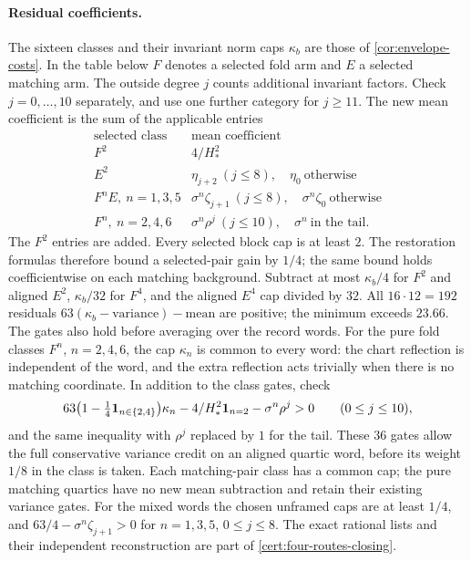 \paragraph{Residual coefficients.}
The sixteen classes and their invariant norm caps $\kappa_b$ are
those of \cref{cor:envelope-costs}. In the table below $F$ denotes a
selected fold arm and $E$ a selected matching arm. The outside degree
$j$ counts additional invariant factors. Check $j=0,\ldots,10$
separately, and use one further category for $j\ge11$.
The new mean coefficient is the sum of the applicable entries
\[
\begin{array}{c|c}
\text{selected class}&\text{mean coefficient}\\ \hline
F^2&4/H_*^2\\
E^2&\eta_{j+2}\ (j\le8),\quad\eta_0\ \text{otherwise}\\
F^nE,\ n=1,3,5&\sigma^n\zeta_{j+1}\ (j\le8),\quad\sigma^n\zeta_0\ \text{otherwise}\\
F^n,\ n=2,4,6&\sigma^n\rho^j\ (j\le10),\quad\sigma^n\ \text{in the tail}.
\end{array}
\]
The $F^2$ entries are added. Every selected block cap is at least $2$.
The restoration formulas therefore bound a selected-pair gain by $1/4$;
the same bound holds coefficientwise on each matching background.
Subtract at most $\kappa_b/4$ for $F^2$ and aligned $E^2$,
$\kappa_b/32$ for $F^4$, and the aligned $E^4$ cap divided by $32$.
All $16\cdot12=192$ residuals $63(\kappa_b-\text{variance})-
\text{mean}$ are positive; the minimum exceeds $23.66$.
The gates also hold before averaging over the record words. For the pure
fold classes $F^n$, $n=2,4,6$, the cap $\kappa_n$ is common to every word:
the chart reflection is independent of the word, and the extra reflection
acts trivially when there is no matching coordinate. In addition to the
class gates, check
\[
 63\bigl(1-\tfrac14\mathbf 1_{n\in\{2,4\}}\bigr)\kappa_n
 -4/H_*^2\mathbf 1_{n=2}-\sigma^n\rho^j>0
 \qquad(0\le j\le10),
\]
and the same inequality with $\rho^j$ replaced by $1$ for the tail.
These $36$ gates allow the full conservative variance credit on an
aligned quartic word, before its weight $1/8$ in the class is taken.
Each matching-pair class has a common cap; the pure matching quartics
have no new mean subtraction and retain their existing variance gates.
For the mixed words the chosen unframed caps are at least $1/4$,
and $63/4-\sigma^n\zeta_{j+1}>0$ for $n=1,3,5$, $0\le j\le8$.
The exact rational lists and their independent reconstruction are
part of \cref{cert:four-routes-closing}.

